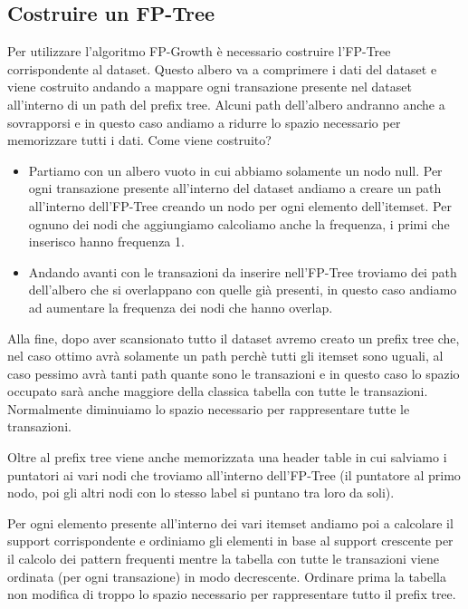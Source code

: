 \documentclass[14pt]{extreport}
\begin{document}
\subsection{Costruire un FP-Tree}

Per utilizzare l'algoritmo FP-Growth è necessario costruire l'FP-Tree corrispondente al dataset.
Questo albero va a comprimere i dati del dataset e viene costruito andando a mappare ogni transazione presente nel dataset all'interno di un path del prefix tree.
Alcuni path dell'albero andranno anche a sovrapporsi e in questo caso andiamo a ridurre lo spazio necessario per memorizzare tutti i dati.
Come viene costruito?
\begin{itemize}
    \item Partiamo con un albero vuoto in cui abbiamo solamente un nodo null. Per ogni transazione presente all'interno del dataset andiamo a creare un path all'interno dell'FP-Tree creando un nodo per ogni elemento dell'itemset. Per ognuno dei nodi che aggiungiamo calcoliamo anche la frequenza, i primi che inserisco hanno frequenza 1.
    \item Andando avanti con le transazioni da inserire nell'FP-Tree troviamo dei path dell'albero che si overlappano con quelle già presenti, in questo caso andiamo ad aumentare la frequenza dei nodi che hanno overlap.
\end{itemize}

Alla fine, dopo aver scansionato tutto il dataset avremo creato un prefix tree che, nel caso ottimo avrà solamente un path perchè tutti gli itemset sono uguali, al caso pessimo avrà tanti path quante sono le transazioni e in questo caso lo spazio occupato sarà anche maggiore della classica tabella con tutte le transazioni. Normalmente diminuiamo lo spazio necessario per rappresentare tutte le transazioni.

Oltre al prefix tree viene anche memorizzata una header table in cui salviamo i puntatori ai vari nodi che troviamo all'interno dell'FP-Tree (il puntatore al primo nodo, poi gli altri nodi con lo stesso label si puntano tra loro da soli).

Per ogni elemento presente all'interno dei vari itemset andiamo poi a calcolare il support corrispondente e ordiniamo gli elementi in base al support crescente per il calcolo dei pattern frequenti mentre la tabella con tutte le transazioni viene ordinata (per ogni transazione) in modo decrescente.
Ordinare prima la tabella non modifica di troppo lo spazio necessario per rappresentare tutto il prefix tree.
\end{document}
